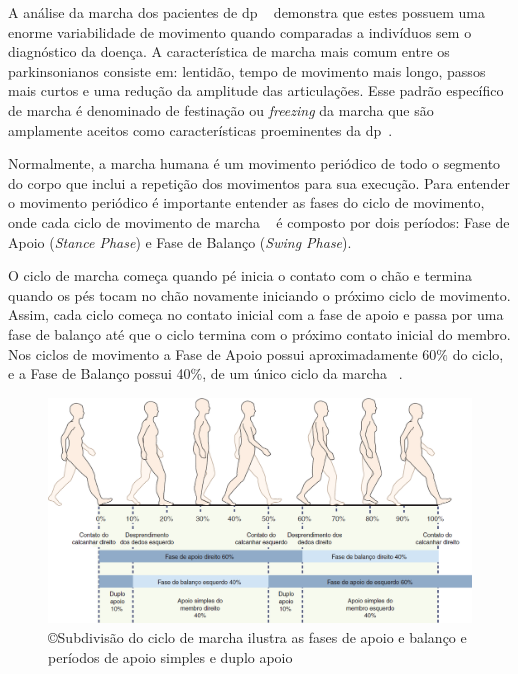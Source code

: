 A análise da marcha dos pacientes de \ac{dp} ~\cite{ambulatoryparkinson2010} demonstra que estes possuem uma enorme variabilidade de movimento quando comparadas a indivíduos sem o diagnóstico da doença. A característica de marcha mais comum entre os parkinsonianos consiste em: lentidão, tempo de movimento mais longo, passos mais curtos e uma redução da amplitude das articulações. Esse padrão específico de marcha é denominado de festinação ou \textit{freezing} da marcha que são amplamente aceitos como características proeminentes da \ac{dp}~\cite{visionbased2009,goul05}.

Normalmente, a marcha humana é um movimento periódico de todo o segmento do corpo que inclui a repetição dos movimentos para sua execução. Para entender o movimento periódico é importante entender as fases do ciclo de movimento, onde cada ciclo de movimento de marcha ~\cite{traducaogait2011} é composto por dois períodos: Fase de Apoio (\textit{Stance Phase}) e Fase de Balanço (\textit{Swing Phase}).

O ciclo de marcha começa quando pé inicia o contato com o chão e termina quando os pés tocam no chão novamente iniciando o próximo ciclo de movimento. Assim, cada ciclo começa no contato inicial com a fase de apoio e passa por uma fase de balanço até que o ciclo termina com o próximo contato inicial do membro. Nos ciclos de movimento a Fase de Apoio possui aproximadamente 60$\%$ do ciclo, e a Fase de Balanço possui 40$\%$, de um único ciclo da marcha ~\cite{neumann2012cinesiologia}.

\begin{figure}[!htbp]
 \centering
 \includegraphics[scale=0.4]{./img/gaitcycle.png}
\caption[Subdivisão do ciclo de marcha ilustra as fases de apoio e balanço e períodos de apoio simples e duplo apoio] {\copyright Subdivisão do ciclo de marcha ilustra as fases de apoio e balanço e períodos de apoio simples e duplo apoio~\cite{neumann2012cinesiologia}}
 \label{fig:gaitcycle}
\end{figure}

